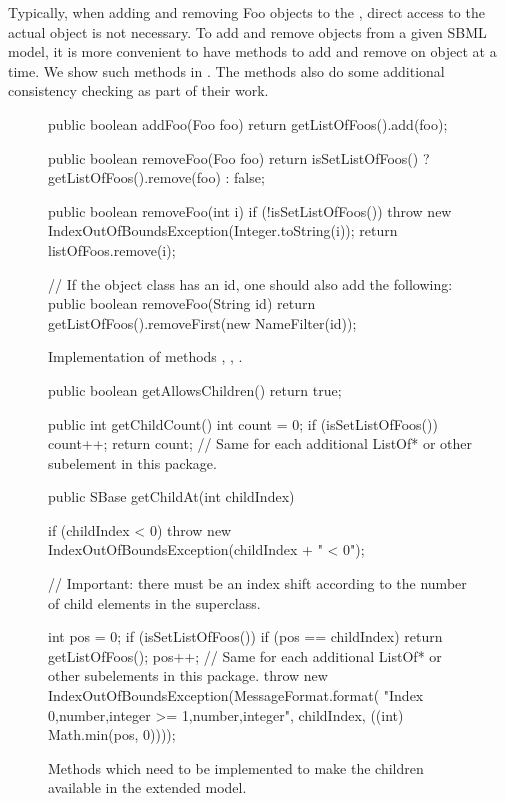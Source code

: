 Typically, when adding and removing Foo objects to the \Model, direct
access to the actual  object is not necessary.  To add and
remove  objects from a given SBML model, it is more convenient to
have methods to add and remove on  object at a time.  We show
such methods in .  The methods also
do some additional consistency checking as part of their work.

\begin{figure}[t]
  \begin{example}
public boolean addFoo(Foo foo) {
    return getListOfFoos().add(foo);
}

public boolean removeFoo(Foo foo) {
  return isSetListOfFoos() ? getListOfFoos().remove(foo) : false;
}

public boolean removeFoo(int i) {
  if (!isSetListOfFoos()) {
    throw new IndexOutOfBoundsException(Integer.toString(i));
  }
  return listOfFoos.remove(i);
}

// If the object class has an id, one should also add the following:
public boolean removeFoo(String id) {
  return getListOfFoos().removeFirst(new NameFilter(id));
}\end{example}
  \caption{Implementation of  methods ,
    , .}
  \label{lst:ModelExtAddRemoveFoos}
\end{figure}

\begin{figure}[hb]
  \begin{example}
public boolean getAllowsChildren() {
  return true;
}

public int getChildCount() {
  int count = 0;
  if (isSetListOfFoos()) {
    count++;
  }
  return count;  // Same for each additional ListOf* or other subelement in this package.
}

public SBase getChildAt(int childIndex) {
  if (childIndex < 0) {
    throw new IndexOutOfBoundsException(childIndex + " < 0");
  }

  // Important: there must be an index shift according to the number of child elements in the superclass.

  int pos = 0;
  if (isSetListOfFoos()) {
    if (pos == childIndex) {
      return getListOfFoos();
    }
    pos++;
  }
  // Same for each additional ListOf* or other subelements in this package.
  throw new IndexOutOfBoundsException(MessageFormat.format(
    "Index {0,number,integer} >= {1,number,integer}", childIndex, ((int) Math.min(pos, 0))));
}\end{example}
  \caption{Methods which need to be implemented to make the children
    available in the extended model.}
  \label{lst:ModelExtChildren}
\end{figure}

